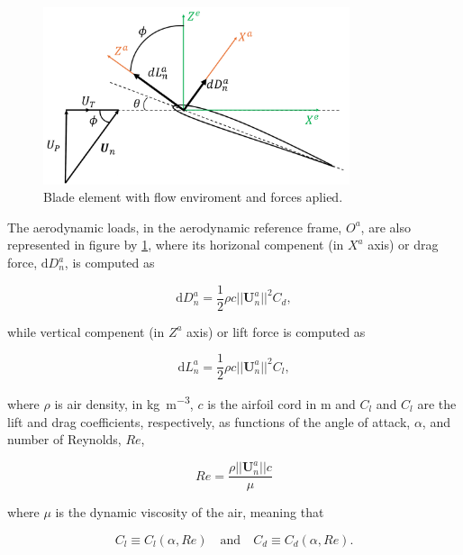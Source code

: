 \begin{figure}[!htb]
    \centering
    \includegraphics[width=9cm]{Figures/background/bet/element.png}
    \caption{Blade element with flow enviroment and forces aplied.}
    \label{fig:element_bet}
\end{figure}




The aerodynamic loads, in the aerodynamic reference frame, $O^a$, are also represented in figure by \ref{fig:element_bet}, where its horizonal compenent (in $X^a$ axis) or drag force, $\mathrm{d}D_n^a$, is computed as

\begin{equation}
    \mathrm{d}D^a_n = \frac{1}{2} \rho c ||\mathbf{U}^a_n||^2 C_d,
    \label{eq:drag_element}
\end{equation}

while vertical compenent (in $Z^a$ axis) or lift force is computed as

\begin{equation}
    \mathrm{d}L^a_n = \frac{1}{2} \rho c ||\mathbf{U}^a_n||^2 C_l,
    \label{eq:lift_element}
\end{equation}

where $\rho$ is air density, in \unit{\kg\per\meter^3}, $c$ is the airfoil cord in \unit{\meter} and $C_l$ and $C_l$ are the lift and drag coefficients, respectively, as functions of the angle of attack, $\alpha$, and number of Reynolds, $Re$,

\begin{equation}
    Re = \frac{\rho ||\mathbf{U}^a_n|| c}{\mu}
    \label{eq:reynolds_number}
\end{equation}

where $\mu$ is the dynamic viscosity of the air, meaning that

\begin{equation}
    C_l \equiv C_l(\alpha, Re) \quad \text{and} \quad C_d\equiv C_d(\alpha, Re).
\end{equation}

